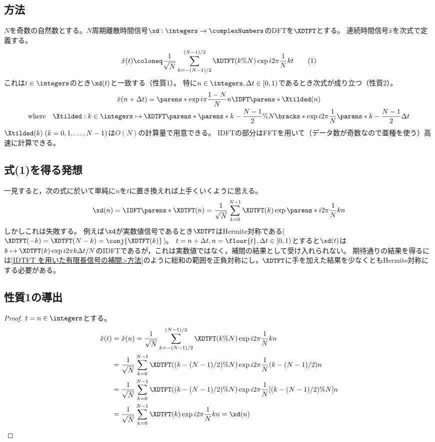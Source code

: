         \subsection{方法}
            \label{IDFT を用いた周期信号の補間>方法}
            $N$を奇数の自然数とする。$N$周期離散時間信号$\xd:\integers\to\complexNumbers$のDFTを$\XDTFT$とする。
            連続時間信号$\hat{x}$を次式で定義する。
            \[ \hat{x}(t) \coloneq \frac{1}{\sqrt{N}}\sum_{k=-(N-1)/2}^{(N-1)/2}\XDTFT(k\%N)\exp i2\pi\frac{1}{N}kt \tag{1} \]
            これは$t\in\integers$のとき$\xd(t)$と一致する（性質1）。
            特に$n\in\integers,\Delta t\in[0,1)$であるとき次式が成り立つ（性質2）。
            \begin{gather}
                \hat{x}(n+\Delta t) = \parens*{\exp i\pi\frac{1-N}{N}n}\IDFT\parens*{\Xtilded}(n) \label{IDFT を用いた周期信号の補間>公式}\\
                \text{where} \quad \Xtilded:k\in\integers\mapsto\XDTFT\parens*{\parens*{k-\frac{N-1}{2}}\%N}\bracks*{\exp i2\pi\frac{1}{N}\parens*{k-\frac{N-1}{2}}\Delta t} \nonumber
            \end{gather}
            $\Xtilded(k)\;(k=0,1,\dots,N-1)$は$O(N)$の計算量で用意できる。
            IDFTの部分はFFTを用いて（データ数が奇数なので亜種を使う）高速に計算できる。
        \subsection{式(1)を得る発想}
            一見すると，次の式に於いて単純に$n$を$t$に置き換えれば上手くいくように思える。
            \[ \xd(n) = \IDFT\parens*{\XDTFT}(n) = \frac{1}{\sqrt{N}}\sum_{k=0}^{N-1}\XDTFT(k)\exp\parens*{i2\pi\frac{1}{N}kn} \]
            しかしこれは失敗する。
            例えば$\xd$が実数値信号であるとき$\XDTFT$はHermite対称である($\XDTFT(-k)=\XDTFT(N-k)=\conj{\XDTFT(k)}$)。
            $t=n+\Delta t,n=\floor{t},\Delta t\in[0,1)$とすると$\xd(t)$は$k\mapsto\XDTFT(k)\exp i2\pi k\Delta t/N$のIDFTであるが，これは実数値ではなく，補間の結果として受け入れられない。
            期待通りの結果を得るには\ref{IDTFT を用いた有限長信号の補間>方法}のように総和の範囲を正負対称にし，$\XDTFT$に手を加えた結果を少なくともHermite対称にする必要がある。
        \subsection{性質1の導出}
            \begin{proof}
                $t = n\in\integers$とする。
                \begin{align*}
                    \hat{x}(t) &= \hat{x}(n) = \frac{1}{\sqrt{N}}\sum_{k=-(N-1)/2}^{(N-1)/2}\XDTFT(k\%N)\exp i2\pi\frac{1}{N}kn \\
                    &= \frac{1}{\sqrt{N}}\sum_{k=0}^{N-1}\XDTFT((k-(N-1)/2)\%N)\exp i2\pi\frac{1}{N}(k-(N-1)/2)n \\
                    &= \frac{1}{\sqrt{N}}\sum_{k=0}^{N-1}\XDTFT((k-(N-1)/2)\%N)\exp i2\pi\frac{1}{N}[(k-(N-1)/2)\%N]n \\
                    &= \frac{1}{\sqrt{N}}\sum_{k=0}^{N-1}\XDTFT(k)\exp i2\pi\frac{1}{N}kn = \xd(n)
                \end{align*}
            \end{proof}
